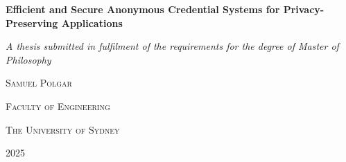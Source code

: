 \begin{titlepage}
    \centering
    {\Huge \textbf{Efficient and Secure Anonymous Credential Systems for Privacy-Preserving Applications} \par} \vspace{1.5cm}
    {\large \emph{A thesis submitted in fulfilment of the requirements for the degree of Master of Philosophy}\par} \vspace{2cm}
    {\LARGE \textsc{Samuel Polgar} \par} \vspace{9cm}
    {\Large \textsc{Faculty of Engineering}\par}
    {\Large \textsc{The University of Sydney} \par} \vspace{1cm}
    {\large 2025}
\end{titlepage}